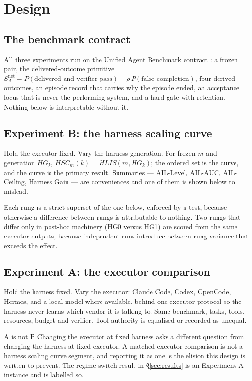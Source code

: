 \documentclass[11pt]{article}
\theoremstyle{definition}
\begin{document}
\section{Design}\label{sec:design}

\subsection{The benchmark contract}

All three experiments run on the Unified Agent Benchmark contract \citep{yang2026uab}: a frozen pair, the delivered-outcome primitive $S^{\text{net}}_A = P(\text{delivered and verifier pass}) - \rho\,P(\text{false completion})$, four derived outcomes, an episode record that carries why the episode ended, an acceptance locus that is never the performing system, and a hard gate with retention. Nothing below is interpretable without it.

\subsection{Experiment B: the harness scaling curve}

Hold the executor fixed. Vary the harness generation. For frozen $m$ and generation $HG_k$, $HSC_m(k) = HLIS(m, HG_k)$; the ordered set is the curve, and the curve is the primary result. Summaries --- AIL-Level, AIL-AUC, AIL-Ceiling, Harness Gain --- are conveniences and one of them is shown below to mislead.

Each rung is a strict superset of the one below, enforced by a test, because otherwise a difference between rungs is attributable to nothing. Two rungs that differ only in post-hoc machinery (HG0 versus HG1) are scored from the same executor outputs, because independent runs introduce between-rung variance that exceeds the effect.

\subsection{Experiment A: the executor comparison}

Hold the harness fixed. Vary the executor: Claude Code, Codex, OpenCode, Hermes, and a local model where available, behind one executor protocol so the harness never learns which vendor it is talking to. Same benchmark, tasks, tools, resources, budget and verifier. Tool authority is equalised or recorded as unequal.

\begin{cautionbox}{A is not B}
Changing the executor at fixed harness asks a different question from changing the harness at fixed executor. A matched executor comparison is not a harness scaling curve segment, and reporting it as one is the elision this design is written to prevent. The regime-switch result in \S\ref{sec:results} is an Experiment A instance and is labelled so.
\end{cautionbox}
\end{document}
